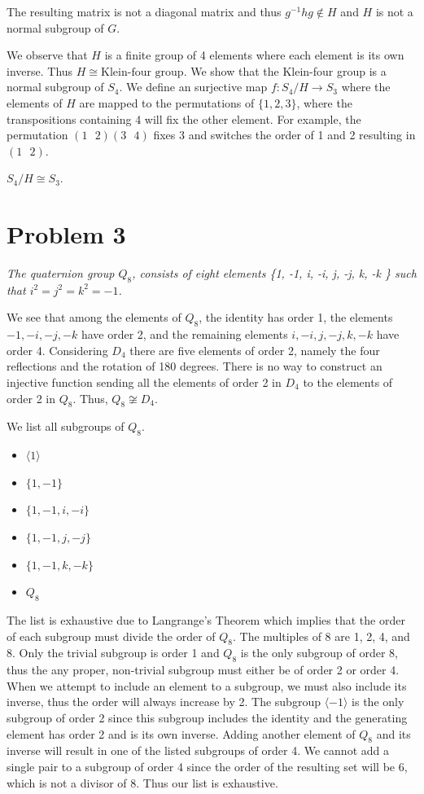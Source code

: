 \documentclass{article}
\theoremstyle{plain} %
\theoremstyle{definition} %
\begin{document}
The resulting matrix is not a diagonal matrix and thus $g^{-1}hg \not\in H$ and $H$ is not a normal subgroup of $G$.

\noindent{}
We observe that $H$ is a finite group of 4 elements where each element is its own inverse. Thus $H \cong \text{Klein-four group}$.
We show that the Klein-four group is a normal subgroup of $S_4$. We define an surjective map $f: S_4/H \to S_3$ where the elements
of $H$ are mapped to the permutations of $\{1,2,3\}$, where the transpositions
containing 4 will fix the other element. For example, the permutation $(1\text{ }2)(3\text{ }4)$
fixes 3 and switches the order of 1 and 2 resulting in $(1\text{ }2)$.

$S_4/H \cong S_3$.

\section*{Problem 3}
\noindent\textit{The quaternion group $Q_8$, consists of eight elements \{1, -1, i, -i, j, -j, k, -k \}
such that $i^2=j^2=k^2=-1$.}

\noindent{}

We see that among the elements of $Q_8$, the identity has order 1, the elements $-1,-i,-j,-k$ have order 2,
and the remaining elements $i, -i, j, -j, k, -k$ have order 4. Considering $D_4$ there are five elements of order 2, namely the 
four reflections and the rotation of 180 degrees. There is no way to construct an injective function sending all the elements
of order 2 in $D_4$ to the elements of order 2 in $Q_8$.
Thus, $Q_8 \not\cong D_4$.

\noindent{}

We list all subgroups of $Q_8$. 
\begin{itemize}
    \item $\langle 1 \rangle$
    \item $\{1, -1\}$
    \item $\{1, -1, i, -i\}$
    \item $\{1, -1, j, -j\}$
    \item $\{1, -1, k, -k\}$
    \item $Q_8$
\end{itemize}
The list is exhaustive due to Langrange's Theorem which implies that the order of
each subgroup must divide the order of $Q_8$. The multiples of 8 are 1, 2, 4, and 8.
Only the trivial subgroup is order 1 and $Q_8$ is the only subgroup of order 8, thus the any proper, non-trivial
subgroup must either be of order 2 or order 4. When we attempt to include an element to a subgroup,
we must also include its inverse, thus the order will always increase by 2. The subgroup $\langle -1 \rangle$ is the
only subgroup of order 2 since this subgroup includes the identity and the generating element has
order 2 and is its own inverse. Adding another element of $Q_8$ and its inverse will result in one 
of the listed subgroups of order 4. We cannot add a single pair to a subgroup of order 4 since
the order of the resulting set will be 6, which is not a divisor of 8. Thus our list is exhaustive.
\end{document}

